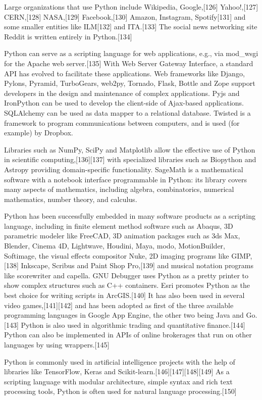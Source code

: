 \documentclass[conference]{IEEEtran} %
\begin{document}
Large organizations that use Python include Wikipedia, Google,[126] Yahoo!,[127] CERN,[128] NASA,[129] Facebook,[130] Amazon, Instagram, Spotify[131] and some smaller entities like ILM[132] and ITA.[133] The social news networking site Reddit is written entirely in Python.[134]

Python can serve as a scripting language for web applications, e.g., via mod_wsgi for the Apache web server.[135] With Web Server Gateway Interface, a standard API has evolved to facilitate these applications. Web frameworks like Django, Pylons, Pyramid, TurboGears, web2py, Tornado, Flask, Bottle and Zope support developers in the design and maintenance of complex applications. Pyjs and IronPython can be used to develop the client-side of Ajax-based applications. SQLAlchemy can be used as data mapper to a relational database. Twisted is a framework to program communications between computers, and is used (for example) by Dropbox.

Libraries such as NumPy, SciPy and Matplotlib allow the effective use of Python in scientific computing,[136][137] with specialized libraries such as Biopython and Astropy providing domain-specific functionality. SageMath is a mathematical software with a notebook interface programmable in Python: its library covers many aspects of mathematics, including algebra, combinatorics, numerical mathematics, number theory, and calculus.

Python has been successfully embedded in many software products as a scripting language, including in finite element method software such as Abaqus, 3D parametric modeler like FreeCAD, 3D animation packages such as 3ds Max, Blender, Cinema 4D, Lightwave, Houdini, Maya, modo, MotionBuilder, Softimage, the visual effects compositor Nuke, 2D imaging programs like GIMP,[138] Inkscape, Scribus and Paint Shop Pro,[139] and musical notation programs like scorewriter and capella. GNU Debugger uses Python as a pretty printer to show complex structures such as C++ containers. Esri promotes Python as the best choice for writing scripts in ArcGIS.[140] It has also been used in several video games,[141][142] and has been adopted as first of the three available programming languages in Google App Engine, the other two being Java and Go.[143] Python is also used in algorithmic trading and quantitative finance.[144] Python can also be implemented in APIs of online brokerages that run on other languages by using wrappers.[145]

Python is commonly used in artificial intelligence projects with the help of libraries like TensorFlow, Keras and Scikit-learn.[146][147][148][149] As a scripting language with modular architecture, simple syntax and rich text processing tools, Python is often used for natural language processing.[150]
\end{document}
